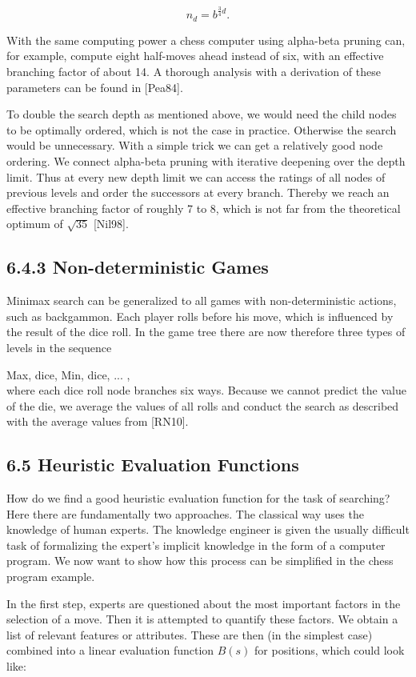 \documentclass[10pt]{article}
\begin{document}
$$
n_{d}=b^{\frac{3}{4} d} .
$$

With the same computing power a chess computer using alpha-beta pruning can, for example, compute eight half-moves ahead instead of six, with an effective branching factor of about 14. A thorough analysis with a derivation of these parameters can be found in [Pea84].

To double the search depth as mentioned above, we would need the child nodes to be optimally ordered, which is not the case in practice. Otherwise the search would be unnecessary. With a simple trick we can get a relatively good node ordering. We connect alpha-beta pruning with iterative deepening over the depth limit. Thus at every new depth limit we can access the ratings of all nodes of previous levels and order the successors at every branch. Thereby we reach an effective branching factor of roughly 7 to 8, which is not far from the theoretical optimum of $\sqrt{35}$ [Nil98].

\subsection*{6.4.3 Non-deterministic Games}
Minimax search can be generalized to all games with non-deterministic actions, such as backgammon. Each player rolls before his move, which is influenced by the result of the dice roll. In the game tree there are now therefore three types of levels in the sequence

Max, dice, Min, dice, ... ,\\[0pt]
where each dice roll node branches six ways. Because we cannot predict the value of the die, we average the values of all rolls and conduct the search as described with the average values from [RN10].

\subsection*{6.5 Heuristic Evaluation Functions}
How do we find a good heuristic evaluation function for the task of searching? Here there are fundamentally two approaches. The classical way uses the knowledge of human experts. The knowledge engineer is given the usually difficult task of formalizing the expert's implicit knowledge in the form of a computer program. We now want to show how this process can be simplified in the chess program example.

In the first step, experts are questioned about the most important factors in the selection of a move. Then it is attempted to quantify these factors. We obtain a list of relevant features or attributes. These are then (in the simplest case) combined into a linear evaluation function $B(s)$ for positions, which could look like:
\end{document}
